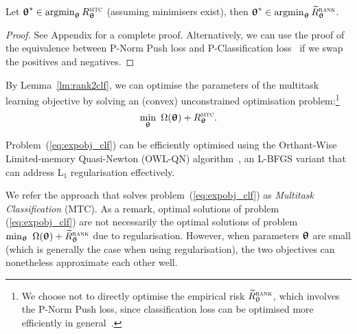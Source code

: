 \begin{lemma}
\label{lm:rank2clf}
Let ${\bm{\uptheta}}^* \in \operatorname*{argmin}_{{\bm{\uptheta}}} R_{{\bm{\uptheta}}}^{\textsc{mtc}}$ (assuming minimisers exist),
then ${\bm{\uptheta}}^* \in \operatorname*{argmin}_{{\bm{\uptheta}}} \widetilde R_{{\bm{\uptheta}}}^{\textsc{rank}}$.
\end{lemma}

\begin{proof}
See Appendix for a complete proof.
Alternatively, 
we can use the proof of the equivalence between P-Norm Push loss and P-Classification loss~\cite{ertekin2011equivalence}
if we swap the positives and negatives.
\end{proof}


By Lemma~\ref{lm:rank2clf}, %
we can optimise the parameters of the multitask learning objective by 
solving an (convex) unconstrained optimisation problem:\footnote{We choose not to directly optimise 
the empirical risk $\widetilde R_{\uptheta}^{\textsc{rank}}$, which involves the P-Norm Push loss, %
since classification loss can be optimised more efficiently in general~\cite{ertekin2011equivalence}.}
\begin{equation}
\label{eq:expobj_clf}
\min_{\bm{\uptheta}} \ \Omega({\bm{\uptheta}}) + R_{{\bm{\uptheta}}}^{\textsc{mtc}}.
\end{equation}

Problem~(\ref{eq:expobj_clf}) can be efficiently optimised using the
Orthant-Wise Limited-memory Quasi-Newton (OWL-QN) algorithm~\cite{andrew2007scalable},
an L-BFGS variant that can address L$_1$ regularisation effectively.

We refer the approach that solves problem~(\ref{eq:expobj_clf}) as \emph{Multitask Classification} (MTC). %
As a remark, optimal solutions of problem (\ref{eq:expobj_clf}) are not necessarily the optimal solutions 
of problem $\min_{\bm{\uptheta}} \ \Omega({\bm{\uptheta}}) + \widetilde R_{{\bm{\uptheta}}}^{\textsc{rank}}$ due to regularisation. %
However, when parameters ${\bm{\uptheta}}$ are small (which is generally the case when using regularisation), the two objectives 
can nonetheless approximate each other well. %


